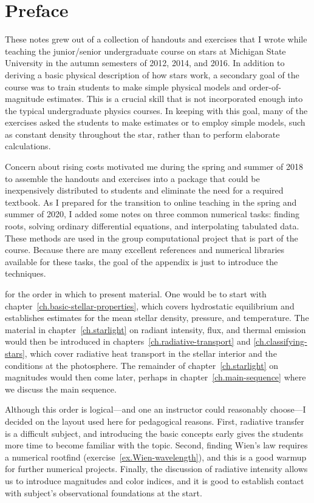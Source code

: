 
\section*{Preface}
These notes grew out of a collection of handouts and exercises that I wrote while teaching the junior/senior undergraduate course on stars at Michigan State University in the autumn semesters of 2012, 2014, and 2016. In addition to deriving a basic physical description of how stars work, a secondary goal of the course was to train students to make simple physical models and order-of-magnitude estimates. This is a crucial skill that is not incorporated enough into the typical undergraduate physics courses. In keeping with this goal, many of the exercises asked the students to make estimates or to employ simple models, such as constant density throughout the star, rather than to perform elaborate calculations.

Concern about rising costs motivated me during the spring and summer of 2018 to assemble the handouts and exercises into a package that could be inexpensively distributed to students and eliminate the need for a required textbook. As I prepared for the transition to online teaching in the spring and summer of 2020, I added some notes on three common numerical tasks: finding roots, solving ordinary differential equations, and interpolating tabulated data. These methods are used in the group computational project that is part of the course. Because there are many excellent references and numerical libraries available for these tasks, the goal of the appendix is just to introduce the techniques.

 for the order in which to present material. One would be to start with chapter~\ref{ch.basic-stellar-properties}, which covers hydrostatic equilibrium and establishes estimates for the mean stellar density, pressure, and temperature. The material in chapter~\ref{ch.starlight} on radiant intensity, flux, and thermal emission would then be introduced in chapters~\ref{ch.radiative-transport} and \ref{ch.classifying-stars}, which cover radiative heat transport in the stellar interior and the conditions at the photosphere. The remainder of chapter~\ref{ch.starlight} on magnitudes would then come later, perhaps in chapter~\ref{ch.main-sequence} where we discuss the main sequence.

Although this order is logical---and one an instructor could reasonably choose---I decided on the layout used here for pedagogical reasons. First, radiative transfer is a difficult subject, and introducing the basic concepts early gives the students more time to become familiar with the topic. Second, finding Wien's law requires a numerical rootfind (exercise~\ref{ex.Wien-wavelength}), and this is a good warmup for further numerical projects. Finally, the discussion of radiative intensity allows us to introduce magnitudes and color indices, and it is good to establish contact with subject's observational foundations at the start.

